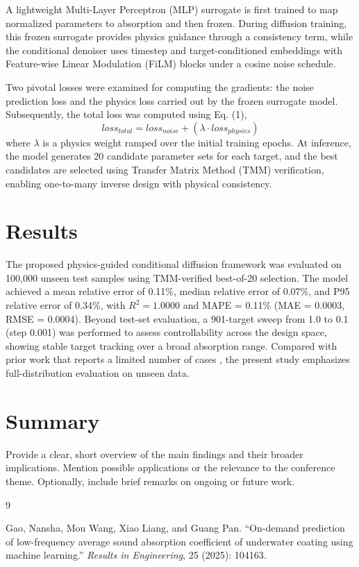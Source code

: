 \documentclass[12pt]{article}
\begin{document}
A lightweight Multi-Layer Perceptron (MLP) surrogate is first trained to map normalized parameters to absorption and then frozen. During diffusion training, this frozen surrogate provides physics guidance through a consistency term, while the conditional denoiser uses timestep and target-conditioned embeddings with Feature-wise Linear Modulation (FiLM) blocks under a cosine noise schedule.

Two pivotal losses were examined for computing the gradients: the noise prediction loss and the physics loss carried out by the frozen surrogate model. Subsequently, the total loss was computed using Eq. (1),
\begin{equation}
    loss_{total} = loss_{noise} + (\lambda \cdot loss_{physics})
    \label{eq:1}
\end{equation}
where $\lambda$ is a physics weight ramped over the initial training epochs. At inference, the model generates 20 candidate parameter sets for each target, and the best candidates are selected using Transfer Matrix Method (TMM) verification, enabling one-to-many inverse design with physical consistency.

\section*{Results}
The proposed physics-guided conditional diffusion framework was evaluated on 100,000 unseen test samples using TMM-verified best-of-20 selection. The model achieved a mean relative error of 0.11\%, median relative error of 0.07\%, and P95 relative error of 0.34\%, with $R^2 = 1.0000$ and MAPE = 0.11\% (MAE = 0.0003, RMSE = 0.0004). Beyond test-set evaluation, a 901-target sweep from 1.0 to 0.1 (step 0.001) was performed to assess controllability across the design space, showing stable target tracking over a broad absorption range. Compared with prior work that reports a limited number of cases \cite{ref1}, the present study emphasizes full-distribution evaluation on unseen data.

\section*{Summary}
Provide a clear, short overview of the main findings and their broader implications. Mention possible applications or the relevance to the conference theme. Optionally, include brief remarks on ongoing or future work.

\begin{thebibliography}{9}

Gao, Nansha, Mou Wang, Xiao Liang, and Guang Pan. ``On-demand prediction of low-frequency average sound absorption coefficient of underwater coating using machine learning.'' \textit{Results in Engineering}, 25 (2025): 104163.


\end{thebibliography}
\end{document}
